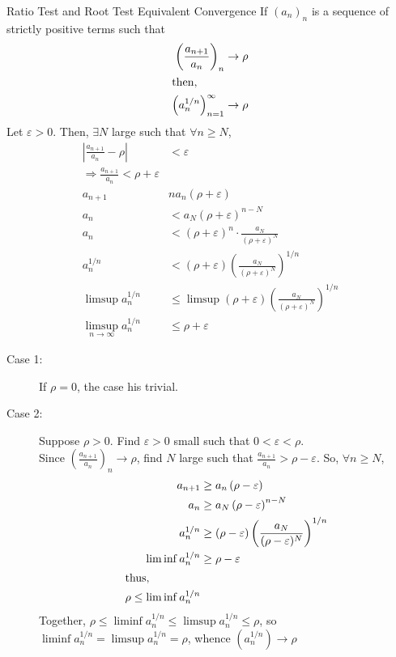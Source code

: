 \documentclass[8pt]{extarticle}
\begin{document}
  \begin{problem}{Ratio Test and Root Test Equivalent Convergence}
    If $(a_n)_n$ is a sequence of strictly positive terms such that
    \begin{align*}
      \left(\frac{a_{n+1}}{a_n}\right)_n &\rightarrow \rho\\
      \shortintertext{then,}
      \left(a_n^{1/n}\right)_{n=1}^{\infty} &\rightarrow \rho
    \end{align*}
    \tcblower
    Let $\varepsilon > 0$. Then, $\exists N$ large such that $\forall n\geq N$,
    \begin{align*}
      \left|\frac{a_{n+1}}{a_n} - \rho\right| &< \varepsilon\tag*{$\forall n\geq N$}\\
      \Rightarrow \frac{a_{n+1}}{a_n} < \rho + \varepsilon\tag*{$\forall n\geq N$}\\
      a_{n+1} &n a_n\left(\rho + \varepsilon\right)\tag*{$\forall n\geq N$}\\
      a_{n} &< a_N \left(\rho + \varepsilon\right)^{n-N}\tag*{$\forall n \geq N$}\\
      a_n &< \left(\rho + \varepsilon\right)^{n}\cdot \frac{a_N}{\left(\rho + \varepsilon\right)^N}\\
      a_n^{1/n} &< \left(\rho + \varepsilon\right) \left(\frac{a_N}{\left(\rho + \varepsilon\right)^N}\right)^{1/n}\\
      \limsup a_n^{1/n}&\leq \limsup \left(\rho + \varepsilon\right) \left(\frac{a_N}{\left(\rho + \varepsilon\right)^N}\right)^{1/n}\\
      \limsup_{n\rightarrow\infty} a_n^{1/n} &\leq \rho + \varepsilon
    \end{align*}
    \begin{description}
      \item[Case 1:] If $\rho = 0$, the case his trivial.
      \item[Case 2:] Suppose $\rho > 0$. Find $\varepsilon > 0$ small such that $0 < \varepsilon < \rho$.\\

        Since $\left(\frac{a_{n+1}}{a_n}\right)_n\rightarrow \rho$, find $N$ large such that $\frac{a_{n+1}}{a_n} > \rho - \varepsilon$. So, $\forall n \geq N$,
        \begin{align*}
          a_{n+1} &\geq a_n\left(\rho-\varepsilon\right)\\
          a_n &\geq a_{N}\left(\rho - \varepsilon\right)^{n-N}\\
          a_n^{1/n} &\geq \left(\rho - \varepsilon\right) \left(\frac{a_N}{(\rho - \varepsilon)^{N}}\right)^{1/n}\\
          \liminf a_n^{1/n} &\geq \rho - \varepsilon\\
          \shortintertext{thus,}
          \rho \leq \liminf a_n^{1/n}
        \end{align*}
        Together, $\rho \leq \liminf a_n^{1/n} \leq \limsup a_n^{1/n} \leq \rho$, so $\liminf a_n^{1/n} = \limsup a_n^{1/n} = \rho$, whence $\left(a_n^{1/n}\right) \rightarrow \rho$
    \end{description}
  \end{problem}
\end{document}
